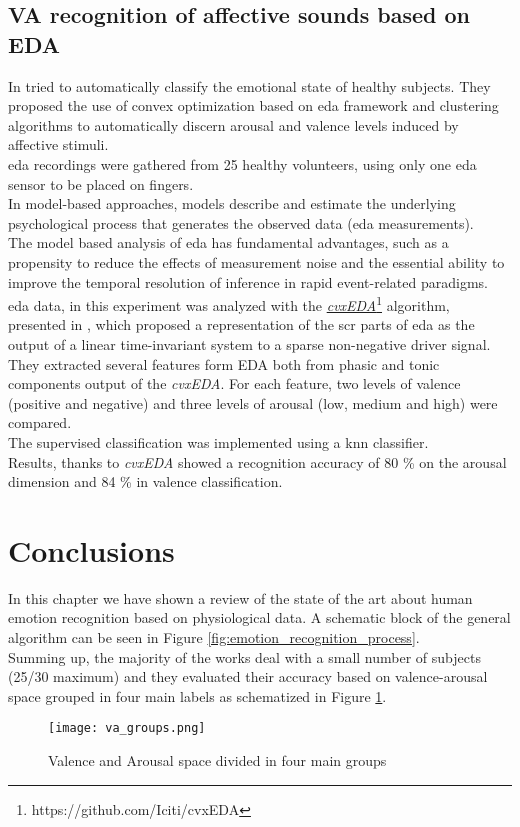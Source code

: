 \subsection{VA recognition of affective sounds based on EDA}
In \cite{greco2016arousal} tried to automatically classify the emotional state of healthy subjects. They proposed the use of convex optimization based on \gls{eda} framework and clustering algorithms to automatically discern arousal and valence levels induced by affective stimuli.
\\ \indent
\gls{eda} recordings were gathered from 25 healthy volunteers, using only one \gls{eda} sensor to be placed on fingers.
\\
In model-based approaches, models describe and estimate the underlying psychological process that generates the observed data (\gls{eda} measurements).
\\
The model based analysis of \gls{eda} has fundamental advantages, such as a propensity to reduce the effects of measurement noise and the essential ability to improve the temporal resolution of inference in rapid event-related paradigms.
\\ \indent
\gls{eda} data, in this experiment was analyzed with the \href{https://github.com/Iciti/cvxEDA}{\textit{cvxEDA}}\footnote{https://github.com/Iciti/cvxEDA} algorithm, presented in \cite{greco2015cvxeda}, which proposed a representation of the \gls{scr} parts of \gls{eda} as the output of a linear time-invariant system to a sparse non-negative driver signal.
\\ \indent
They extracted several features form EDA both from phasic and tonic components output of the \textit{cvxEDA}. For each feature, two levels of valence (positive and negative) and three levels of arousal (low, medium and high) were compared.
\\
The supervised classification was implemented using a \gls{knn} classifier.
\\ \indent
Results, thanks to \textit{cvxEDA} showed a recognition accuracy of 80 \% on the arousal dimension and 84 \% in valence classification.

\newpage
\section{Conclusions}
In this chapter we have shown a review of the state of the art about human emotion recognition based on physiological data. A schematic block of the general algorithm can be seen in Figure \ref{fig:emotion_recognition_process}.
\\
Summing up, the majority of the works deal with a small number of subjects (25/30 maximum) and they evaluated their accuracy based on valence-arousal space grouped in four main labels as schematized in Figure \ref{fig:va_groups}.
\begin{figure}[h]
    \centering
    \texttt{[image: va\_groups.png]} 
	\caption{Valence and Arousal space divided in four main groups}
    \label{fig:va_groups}
\end{figure}